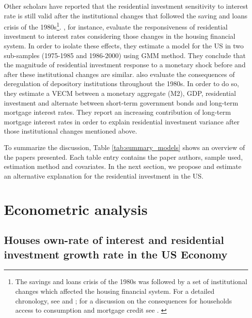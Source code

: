 \documentclass[12pt, a4paper]{article}
\begin{document}
Other scholars have reported that the residential investment sensitivity to interest rate is still valid after the institutional changes that followed the saving and loans crisis of the 1980s\footnote{The savings and loans crisis of the 1980s was followed by a set of institutional changes which affected the housing financial system. For a detailed chronology, see  \textcite[Appendix B]{mccarthyMonetaryPolicyTransmission2002} and \textcite{green_american_2005}; for a discussion on the consequences for households access to consumption and mortgage credit see \textcite{federal_deposit_insurance_corporation_savings_1997,wall_too_2010}. \label{nota_instituicoes}}.
\textcite{mccarthyMonetaryPolicyTransmission2002}, for instance, evaluate the responsiveness of residential investment to interest rates considering those changes in the housing financial system.
In order to isolate these effects, they estimate  a model for the US in two sub-samples (1975-1985 and 1986-2000) using GMM method.
They conclude that the magnitude of residential investment response to a monetary shock before and after these institutional changes are similar.
\textcite{gauger_residential_2003} also evaluate the consequences of deregulation of depository institutions throughout the 1980s.
In order to do so, they estimate a VECM between a monetary aggregate (M2), GDP, residential investment and alternate between short-term government bonds and long-term mortgage interest rates.
They report an increasing contribution of long-term mortgage interest rates in order to explain residential investment variance after those institutional changes mentioned above.


To summarize the discussion, Table \ref{tab:summary_models} shows an overview of the papers presented.
Each table entry contains the paper authors, sample used, estimation method and covariates.
In the next section, we propose and estimate an alternative explanation for the residential investment in the US.




\section{Econometric analysis}
\label{sec:orga30f956}
\label{sec:VECM}
\subsection{Houses own-rate of interest and residential investment growth rate in the US Economy}
\label{sec:org694aa21}
\label{sec:own}
\end{document}
